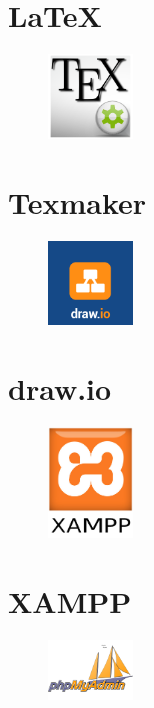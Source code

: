 \section{LaTeX}

\begin{figure}
  \begin{center}
    \includegraphics[width=0.2\textwidth] {bilder/Texmaker}
  \end{center}
\end{figure}
\section{Texmaker}

\begin{figure}
  \begin{center}
    \includegraphics[width=0.2\textwidth] {bilder/Draw_io}
  \end{center}
\end{figure}
\section{draw.io}

\begin{figure}
  \begin{center}
    \includegraphics[width=0.2\textwidth] {bilder/XAMPP}
  \end{center}
\end{figure}
\section{XAMPP}
\newpage
\begin{figure}
  \begin{center}
    \includegraphics[width=0.2\textwidth] {bilder/phpMyAdmin}
  \end{center}
\end{figure}
